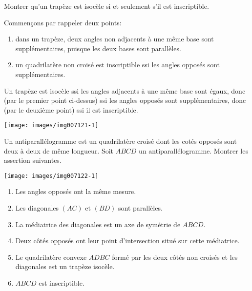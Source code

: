\begin{exo}
Montrer qu'un trapèze est isocèle si et seulement s'il est inscriptible.


\begin{sol}
Commençons par rappeler deux points:
\begin{enumerate}
\item dans un trapèze, deux angles non adjacents à une même base sont supplémentaires, puisque les deux bases sont parallèles.
\item un quadrilatère non croisé est inscriptible ssi les angles opposés sont supplémentaires.
\end{enumerate}

Un trapèze est isocèle ssi les angles adjacents à une même base sont égaux, donc (par le premier point ci-dessus) ssi les angles opposés sont supplémentaires, donc (par le deuxième point) ssi il est inscriptible.

\begin{center}
\texttt{[image: images/img007121-1]}
\end{center}

\end{sol}
\end{exo}  


\begin{exo}[antiparallélogramme]
Un antiparallélogramme est un quadrilatère croisé dont les cotés opposés sont deux à deux de même longueur. Soit $ABCD$ un antiparallélogramme. Montrer les assertion suivantes.

\begin{center}
\texttt{[image: images/img007122-1]}
\end{center}

\begin{enumerate}
\item Les angles opposés ont la même mesure.
\item Les diagonales $(AC)$ et $(BD)$ sont parallèles.
\item La médiatrice des diagonales est un axe de symétrie de $ABCD$.
\item Deux côtés opposés ont leur point d'intersection situé sur cette médiatrice.
\item Le quadrilatère convexe $ADBC$ formé par les deux côtés non croisés et les diagonales est un trapèze isocèle.
\item $ABCD$ est inscriptible.
\end{enumerate}


\end{exo}  




